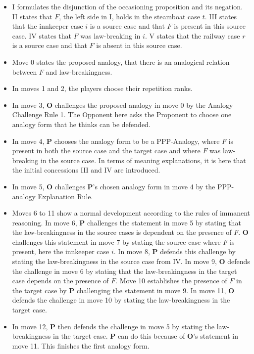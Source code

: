 				\begin{itemize}
				\item I formulates the disjunction of the occasioning proposition and its negation. II states that $F$, the left side in I, holds in the steamboat case $t$. III states that the innkeeper case $i$ is a source case and that $F$ is present in this source case. IV states that $F$ was law-breaking in $i$. V states that the railway case $r$ is a source case and that $F$ is absent in this source case. 
				\item Move 0 states the proposed analogy, that there is an analogical relation between $F$ and law-breakingness. 
				\item In moves 1 and 2, the players choose their repetition ranks. 
				\item In move 3, \textbf{O} challenges the proposed analogy in move 0 by the Analogy Challenge Rule 1. The Opponent here asks the Proponent to choose one analogy form that he thinks can be defended.
				\item In move 4, \textbf{P} chooses the analogy form to be a PPP-Analogy, where $F$ is present in both the source case and the target case and where $F$ was law-breaking in the source case. In terms of meaning explanations, it is here that the initial concessions III and IV are introduced. 
				\item In move 5, \textbf{O} challenges \textbf{P}'s chosen analogy form in move 4 by the PPP-analogy Explanation Rule. 
				\item Moves 6 to 11 show a normal development according to the rules of immanent reasoning. In move 6, \textbf{P} challenges the statement in move 5 by stating that the law-breakingness in the source cases is dependent on the presence of $F$. \textbf{O} challenges this statement in move 7 by stating the source case where $F$ is present, here the innkeeper case $i$. In move 8, \textbf{P} defends this challenge by stating the law-breakingness in the source case from IV. In move 9, \textbf{O} defends the challenge in move 6 by stating that the law-breakingness in the target case depends on the presence of $F$. Move 10 establishes the presence of $F$ in the target case by \textbf{P} challenging the statement in move 9. In move 11, \textbf{O} defends the challenge in move 10 by stating the law-breakingness in the target case. 
				\item In move 12, \textbf{P} then defends the challenge in move 5 by stating the law-breakingness in the target case. \textbf{P} can do this because of \textbf{O}'s statement in move 11. This finishes the first analogy form. 

\end{itemize}
